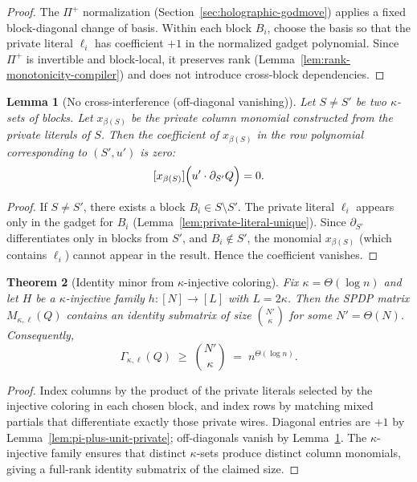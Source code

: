 \documentclass[12pt]{article}
\newtheorem{theorem}{Theorem}
\newtheorem{lemma}[theorem]{Lemma}
\theoremstyle{definition}
\theoremstyle{definition}
\theoremstyle{remark}
\theoremstyle{remark}
\begin{document}
\begin{proof}
The $\Pi^+$ normalization (Section~\ref{sec:holographic-godmove}) applies a fixed block-diagonal
change of basis. Within each block $B_i$, choose the basis so that the private literal $\ell_i$
has coefficient $+1$ in the normalized gadget polynomial. Since $\Pi^+$ is invertible and
block-local, it preserves rank (Lemma~\ref{lem:rank-monotonicity-compiler}) and does not
introduce cross-block dependencies.
\end{proof}

\begin{lemma}[No cross-interference (off-diagonal vanishing)]
\label{lem:offdiag-vanish-private}
Let $S\neq S'$ be two $\kappa$-sets of blocks. Let $x_{\beta(S)}$ be the private column monomial
constructed from the private literals of $S$. Then the coefficient of $x_{\beta(S)}$ in the row
polynomial corresponding to $(S',u')$ is zero:
\[
[x_{\beta(S)}]\Bigl(u'\cdot \partial_{S'}Q\Bigr)=0.
\]
\end{lemma}

\begin{proof}
If $S\neq S'$, there exists a block $B_i\in S\setminus S'$. The private literal $\ell_i$
appears only in the gadget for $B_i$ (Lemma~\ref{lem:private-literal-unique}). Since
$\partial_{S'}$ differentiates only in blocks from $S'$, and $B_i\notin S'$, the monomial
$x_{\beta(S)}$ (which contains $\ell_i$) cannot appear in the result. Hence the coefficient
vanishes.
\end{proof}

\begin{theorem}[Identity minor from $\kappa$-injective coloring]
\label{thm:identity-minor-k-injective}
Fix $\kappa=\Theta(\log n)$ and let $H$ be a $\kappa$-injective family $h:[N]\to[L]$ with $L=2\kappa$.
Then the SPDP matrix $M_{\kappa,\ell}(Q)$ contains an identity submatrix of size
$\binom{N'}{\kappa}$ for some $N'=\Theta(N)$. Consequently,
\[
\Gamma_{\kappa,\ell}(Q)\;\ge\;\binom{N'}{\kappa}\;=\;n^{\Theta(\log n)}.
\]
\end{theorem}

\begin{proof}
Index columns by the product of the private literals selected by the injective coloring
in each chosen block, and index rows by matching mixed partials that differentiate exactly
those private wires.  Diagonal entries are $+1$ by Lemma~\ref{lem:pi-plus-unit-private};
off-diagonals vanish by Lemma~\ref{lem:offdiag-vanish-private}. The $\kappa$-injective family
ensures that distinct $\kappa$-sets produce distinct column monomials, giving a full-rank
identity submatrix of the claimed size.
\end{proof}
\end{document}
